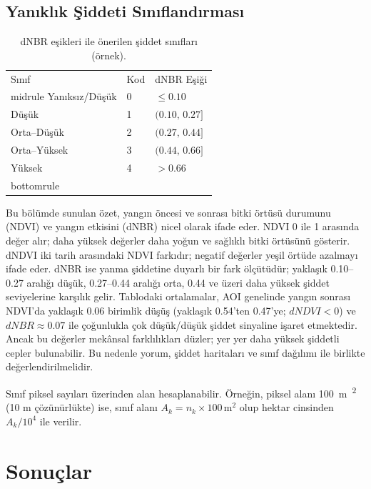 \documentclass[11pt,a4paper]{article}
\begin{document}
\subsection{Yanıklık Şiddeti Sınıflandırması}
\begin{table}[h]
  \centering
  \begin{tabular}{@{}lll@{}}\toprule
  Sınıf & Kod & dNBR Eşiği \\midrule
  Yanıksız/Düşük & 0 & $\leq 0.10$ \\
  Düşük & 1 & $(0.10,\,0.27]$ \\
  Orta--Düşük & 2 & $(0.27,\,0.44]$ \\
  Orta--Yüksek & 3 & $(0.44,\,0.66]$ \\
  Yüksek & 4 & $> 0.66$ \\bottomrule
  \end{tabular}
  \caption{dNBR eşikleri ile önerilen şiddet sınıfları (örnek).}
\end{table}



Bu bölümde sunulan özet, yangın öncesi ve sonrası bitki örtüsü durumunu (NDVI) ve yangın etkisini (dNBR) nicel olarak ifade eder. NDVI 0 ile 1 arasında değer alır; daha yüksek değerler daha yoğun ve sağlıklı bitki örtüsünü gösterir. dNDVI iki tarih arasındaki NDVI farkıdır; negatif değerler yeşil örtüde azalmayı ifade eder. dNBR ise yanma şiddetine duyarlı bir fark ölçütüdür; yaklaşık 0.10--0.27 aralığı düşük, 0.27--0.44 aralığı orta, 0.44 ve üzeri daha yüksek şiddet seviyelerine karşılık gelir. Tablodaki ortalamalar, AOI genelinde yangın sonrası NDVI’da yaklaşık 0.06 birimlik düşüş (yaklaşık 0.54'ten 0.47'ye; \(dNDVI<0\)) ve \(dNBR \approx 0.07\) ile çoğunlukla çok düşük/düşük şiddet sinyaline işaret etmektedir. Ancak bu değerler mekânsal farklılıkları düzler; yer yer daha yüksek şiddetli cepler bulunabilir. Bu nedenle yorum, şiddet haritaları ve sınıf dağılımı ile birlikte değerlendirilmelidir.

Sınıf piksel sayıları üzerinden alan hesaplanabilir. Örneğin, piksel alanı \SI{100}{m\textsuperscript{2}}
(10 m çözünürlükte) ise, sınıf alanı $A_k = n_k \times 100\,\mathrm{m^2}$ olup
hektar cinsinden $A_k/10^4$ ile verilir.

\section{Sonuçlar}
\end{document}
